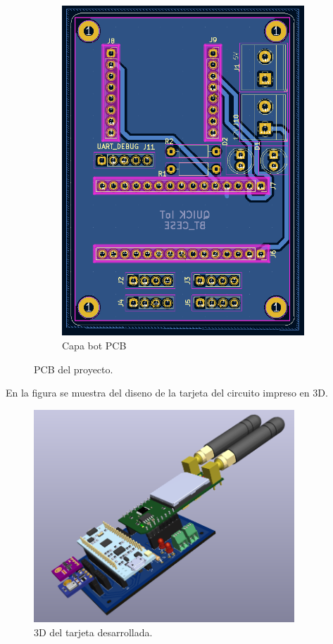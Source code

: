 \begin{figure}[h!]
\begin{subfigure}[b]{0.44\linewidth}
  \includegraphics[width=\linewidth]{./Figures/pcb_bot.png}
  \caption{Capa bot PCB}
  \label{fig:Capa bot PCB}
  \end{subfigure}
  \caption{PCB del proyecto.}
  \label{fig:PCB del proyecto}
  \end{figure}

En la figura se muestra del diseno de la tarjeta del circuito impreso en 3D.
\begin{figure}[h!]
  \centering
	\includegraphics[width=\textwidth, height=8cm]{./Figures/tarjeta3d.png}
  \caption{3D del tarjeta desarrollada.}
	\label{fig:3D del modulo}
\end{figure}



